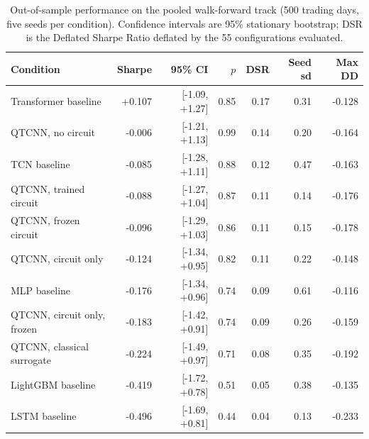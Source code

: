 \begin{table}[t]
\centering
\caption{Out-of-sample performance on the pooled walk-forward track (\num{500} trading days, five seeds per condition). Confidence intervals are 95\% stationary bootstrap; DSR is the Deflated Sharpe Ratio deflated by the \num{55} configurations evaluated.}
\label{tab:headline}
\small
\begin{tabular}{lrrrrrr}
\toprule
Condition & Sharpe & 95\% CI & $p$ & DSR & Seed sd & Max DD \\
\midrule
Transformer baseline & +0.107 & [-1.09, +1.27] & 0.85 & 0.17 & 0.31 & -0.128 \\
QTCNN, no circuit & -0.006 & [-1.21, +1.13] & 0.99 & 0.14 & 0.20 & -0.164 \\
TCN baseline & -0.085 & [-1.28, +1.11] & 0.88 & 0.12 & 0.47 & -0.163 \\
QTCNN, trained circuit & -0.088 & [-1.27, +1.04] & 0.87 & 0.11 & 0.14 & -0.176 \\
QTCNN, frozen circuit & -0.096 & [-1.29, +1.03] & 0.86 & 0.11 & 0.15 & -0.178 \\
QTCNN, circuit only & -0.124 & [-1.34, +0.95] & 0.82 & 0.11 & 0.22 & -0.148 \\
MLP baseline & -0.176 & [-1.34, +0.96] & 0.74 & 0.09 & 0.61 & -0.116 \\
QTCNN, circuit only, frozen & -0.183 & [-1.42, +0.91] & 0.74 & 0.09 & 0.26 & -0.159 \\
QTCNN, classical surrogate & -0.224 & [-1.49, +0.97] & 0.71 & 0.08 & 0.35 & -0.192 \\
LightGBM baseline & -0.419 & [-1.72, +0.78] & 0.51 & 0.05 & 0.38 & -0.135 \\
LSTM baseline & -0.496 & [-1.69, +0.81] & 0.44 & 0.04 & 0.13 & -0.233 \\
\bottomrule
\end{tabular}
\end{table}
